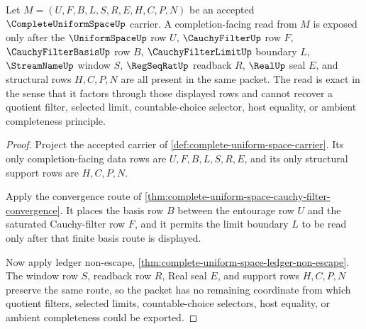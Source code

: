 \begin{theorem}
\label{thm:complete-uniform-space-filterbasis-limit-exactness}
Let $M=(U,F,B,L,S,R,E,H,C,P,N)$ be an accepted $\CompleteUniformSpaceUp$ carrier. A completion-facing read from $M$ is exposed only after the $\UniformSpaceUp$ row $U$, $\CauchyFilterUp$ row $F$, $\CauchyFilterBasisUp$ row $B$, $\CauchyFilterLimitUp$ boundary $L$, $\StreamNameUp$ window $S$, $\RegSeqRatUp$ readback $R$, $\RealUp$ seal $E$, and structural rows $H,C,P,N$ are all present in the same packet. The read is exact in the sense that it factors through those displayed rows and cannot recover a quotient filter, selected limit, countable-choice selector, host equality, or ambient completeness principle.
\end{theorem}
\begin{proof}
Project the accepted carrier of \autoref{def:complete-uniform-space-carrier}. Its only completion-facing data rows are $U,F,B,L,S,R,E$, and its only structural support rows are $H,C,P,N$.

Apply the convergence route of \autoref{thm:complete-uniform-space-cauchy-filter-convergence}. It places the basis row $B$ between the entourage row $U$ and the saturated Cauchy-filter row $F$, and it permits the limit boundary $L$ to be read only after that finite basis route is displayed.

Now apply ledger non-escape, \autoref{thm:complete-uniform-space-ledger-non-escape}. The window row $S$, readback row $R$, Real seal $E$, and support rows $H,C,P,N$ preserve the same route, so the packet has no remaining coordinate from which quotient filters, selected limits, countable-choice selectors, host equality, or ambient completeness could be exported.
\end{proof}

